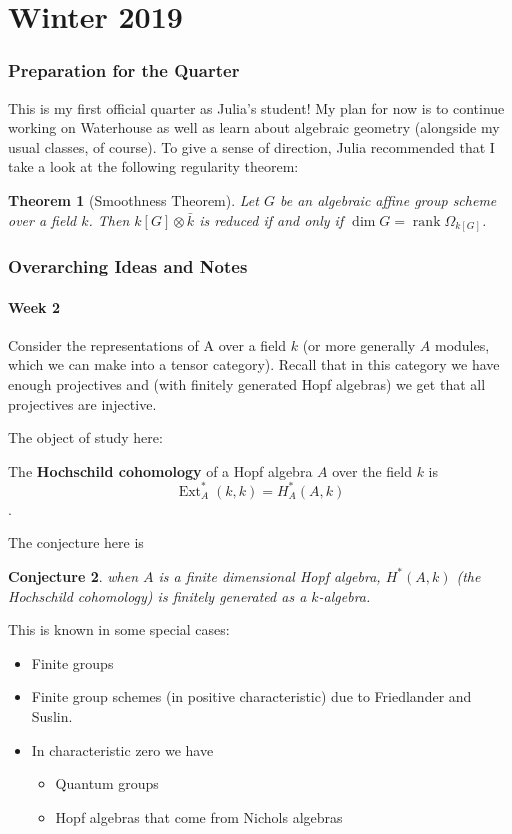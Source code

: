 \documentclass[12pt]{article}
\theoremstyle{nonumberbreak}
\theoremstyle{changebreak}
\newtheorem{thm}{Theorem}[subsection]
\newtheorem{conj}[thm]{Conjecture}
\theoremstyle{nonumberplain}
\theoremstyle{change}
\DeclareMathOperator{\Ext}{Ext}
\DeclareMathOperator{\rank}{rank}
\let\oldpart\part%
\renewcommand{\part}{\clearpage\oldpart}%
\begin{document}

\part{Winter 2019}
\section{Preparation for the Quarter}
This is my first official quarter as Julia's student! My plan for now is to continue working on Waterhouse as well
as learn about algebraic geometry (alongside my usual classes, of course).
To give a sense of direction, Julia recommended that I take a look at the following regularity theorem:
\begin{thm}[Smoothness Theorem]\label{smooth}
	Let $G$ be an algebraic affine group scheme over a field $k$. Then $k[G]\otimes \bar k$ is reduced if and
	only if $\dim G = \rank \Omega_{k[G]}$.
\end{thm}

\section{Overarching Ideas and Notes}
\subsection{Week 2}
Consider the representations of A over a field $k$ (or more generally $A$ modules, which we can make into a tensor category).
Recall that in this category we have enough projectives and (with finitely generated Hopf algebras) we get that all projectives are injective.

The object of study here:
\begin{defn}
	The \textbf{Hochschild cohomology} of a Hopf algebra $A$ over the field $k$ is 
	\[\Ext_A^*(k,k)=H^*_A(A,k)\].
\end{defn}

The conjecture here is
\begin{conj}
	when $A$ is a finite dimensional Hopf algebra, $H^*(A,k)$ (the Hochschild cohomology) 
	is finitely generated as a $k$-algebra.
\end{conj}
This is known in some special cases:
\begin{itemize}
	\item Finite groups
	\item Finite group schemes (in positive characteristic) due to Friedlander and Suslin.
	\item In characteristic zero we have
	\begin{itemize}
		\item Quantum groups
		\item Hopf algebras that come from Nichols algebras
	\end{itemize}
\end{itemize}
\end{document}
